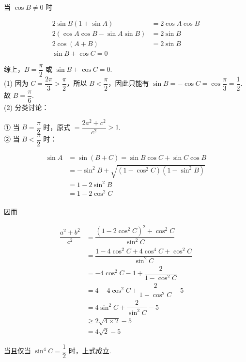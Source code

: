 \documentclass[UTF8]{ctexart}
\newcommand{\lt}{<}
\newcommand{\gt}{>}
\begin{document}
\noindent 当 $\cos B \neq 0$ 时

\begin{align*}
2 \sin B(1+ \sin A) &= 2 \cos A \cos B \\
2(\cos A \cos B-\sin A \sin B) &= 2 \sin B \\
2 \cos(A+B) &= 2 \sin B \\
\sin B+\cos C=0
\end{align*}

\noindent 综上，$B=\dfrac{\pi}{2}$ 或 $\sin B+\cos C=0$. \\

\noindent (1) 因为 $C=\dfrac{2 \pi}{3} \gt \dfrac{\pi}{2}$，所以 $B \lt \dfrac{\pi}{2}$，因此只能有 $\sin B=-\cos C=\cos \dfrac{\pi}{3}=\dfrac{1}{2}$. \\

\noindent 故 $B=\dfrac{\pi}{6}$. \\

\noindent (2) 分类讨论：

\noindent ① 当 $B=\dfrac{\pi}{2}$ 时，原式 $=\dfrac{2a^2+c^2}{c^2} \gt 1$. \\

\noindent ② 当 $B \lt \dfrac{\pi}{2}$ 时：

\begin{align*}
\sin A &= \sin(B+C)=\sin B \cos C+\sin C \cos B \\
&= -\sin^2 B+\sqrt{(1-\cos^2 C)(1-\sin^2 B)} \\
&= 1-2 \sin^2 B \\
&= 1-2 \cos^2 C \\
\end{align*}

\noindent 因而

\begin{align*}
\dfrac{a^2+b^2}{c^2} &= \dfrac{(1-2 \cos^2 C)^2+\cos^2 C}{\sin^2 C} \\
&= \dfrac{1-4 \cos^2 C+4 \cos^4 C+\cos^2 C}{\sin^2 C} \\
&= -4 \cos^2 C-1+\dfrac{2}{1-\cos ^2 C} \\
&= 4-4 \cos^2 C+\dfrac{2}{1-\cos^2 C} -5 \\
&= 4 \sin^2 C+\dfrac{2}{\sin^2 C}-5 \\
&\ge 2 \sqrt{4 \times 2}-5 \\
&= 4 \sqrt{2}-5
\end{align*}

\noindent 当且仅当 $\sin^4 C=\dfrac{1}{2}$ 时，上式成立. \\
\end{document}
